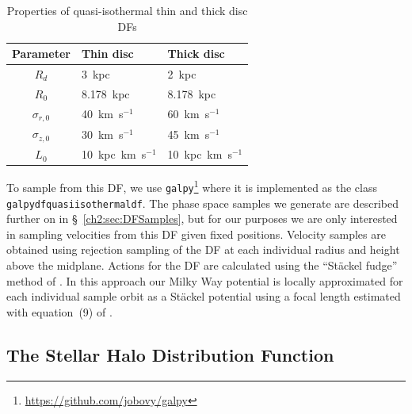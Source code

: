 \begin{table}
    \begin{center}
        \caption{Properties of quasi-isothermal thin and thick disc DFs}
        \label{ch2:table:discDFParameters}
        \begin{tabular}{cll}
            Parameter & Thin disc & Thick disc  \\
            \hline
            $R_{d}$          & 3~kpc               & 2~kpc              \\
            $R_{0}$          & 8.178~kpc           & 8.178~kpc          \\
            $\sigma_{r,0}$   & 40~km~s$^{-1}$      & 60~km~s$^{-1}$     \\
            $\sigma_{z,0}$   & 30~km~s$^{-1}$      & 45~km~s$^{-1}$     \\
            $L_{0}$          & 10~kpc~km~s$^{-1}$  & 10~kpc~km~s$^{-1}$ \\
        \end{tabular}
    \end{center}
\end{table}

To sample from this DF, we use \texttt{galpy}\footnote{\url{https://github.com/jobovy/galpy}} \parencite{bovy15} where it is implemented as the class \texttt{galpydfquasiisothermaldf}. The phase space samples we generate are described further on in \S~\ref{ch2:sec:DFSamples}, but for our purposes we are only interested in sampling velocities from this DF given fixed positions. Velocity samples are obtained using rejection sampling of the DF at each individual radius and height above the midplane. Actions for the DF are calculated using the ``St\"{a}ckel fudge'' method of \textcite{binney12}. In this approach our Milky Way potential is locally approximated for each individual sample orbit as a St\"{a}ckel potential using a focal length estimated with equation~(9) of \textcite{sanders12}.

\subsection{The Stellar Halo Distribution Function}
\label{ch2:subsec:HaloDistributionFunction}

